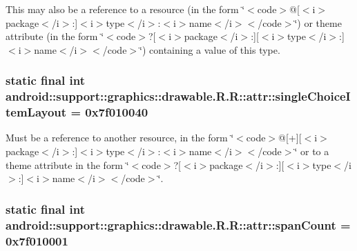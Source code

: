 This may also be a reference to a resource (in the form \char`\"{}$<$code$>$@\mbox{[}$<$i$>$package$<$/i$>$:\mbox{]}$<$i$>$type$<$/i$>$:$<$i$>$name$<$/i$>$$<$/code$>$\char`\"{}) or theme attribute (in the form \char`\"{}$<$code$>$?\mbox{[}$<$i$>$package$<$/i$>$:\mbox{]}\mbox{[}$<$i$>$type$<$/i$>$:\mbox{]}$<$i$>$name$<$/i$>$$<$/code$>$\char`\"{}) containing a value of this type. \hypertarget{classandroid_1_1support_1_1graphics_1_1drawable_1_1_r_1_1attr_52dcac8ed15c57595cf656c16bdcaecd}{
\subsubsection[{singleChoiceItemLayout}]{\setlength{\rightskip}{0pt plus 5cm}static final int android::support::graphics::drawable.R.R::attr::singleChoiceItemLayout = 0x7f010040}}
\label{classandroid_1_1support_1_1graphics_1_1drawable_1_1_r_1_1attr_52dcac8ed15c57595cf656c16bdcaecd}


Must be a reference to another resource, in the form \char`\"{}$<$code$>$@\mbox{[}+\mbox{]}\mbox{[}$<$i$>$package$<$/i$>$:\mbox{]}$<$i$>$type$<$/i$>$:$<$i$>$name$<$/i$>$$<$/code$>$\char`\"{} or to a theme attribute in the form \char`\"{}$<$code$>$?\mbox{[}$<$i$>$package$<$/i$>$:\mbox{]}\mbox{[}$<$i$>$type$<$/i$>$:\mbox{]}$<$i$>$name$<$/i$>$$<$/code$>$\char`\"{}. \hypertarget{classandroid_1_1support_1_1graphics_1_1drawable_1_1_r_1_1attr_eabf3465dd3f604a81035b961dd5f9ad}{
\subsubsection[{spanCount}]{\setlength{\rightskip}{0pt plus 5cm}static final int android::support::graphics::drawable.R.R::attr::spanCount = 0x7f010001}}
\label{classandroid_1_1support_1_1graphics_1_1drawable_1_1_r_1_1attr_eabf3465dd3f604a81035b961dd5f9ad}



